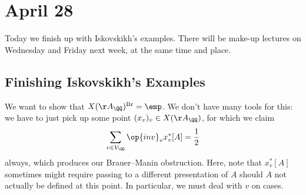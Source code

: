 \documentclass[../notes.tex]{subfiles}
\begin{document}
\section{April 28}

Today we finish up with Iskovskikh's examples. There will be make-up lectures on Wednesday and Friday next week, at the same time and place.

\subsection{Finishing Iskovskikh's Examples}
We want to show that $X(\AA_\QQ)^{\mathrm{Br}}=\emp$. We don't have many tools for this: we have to just pick up some point $(x_v)_v\in X(\AA_\QQ)$, for which we claim
\[\sum_{v\in V_\QQ}\op{inv}_vx_v^*[A]=\frac12\]
always, which produces our Brauer--Manin obstruction. Here, note that $x_v^*[A]$ sometimes might require passing to a different presentation of $A$ should $A$ not actually be defined at this point. In particular, we must deal with $v$ on cases.
\end{document}
